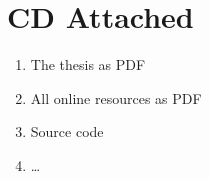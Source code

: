 
\chapter{CD Attached}
\label{cha:CDAttached}

\begin{enumerate}
	\item The thesis as PDF
	\item All online resources as PDF
	\item Source code
	\item \ldots
\end{enumerate}